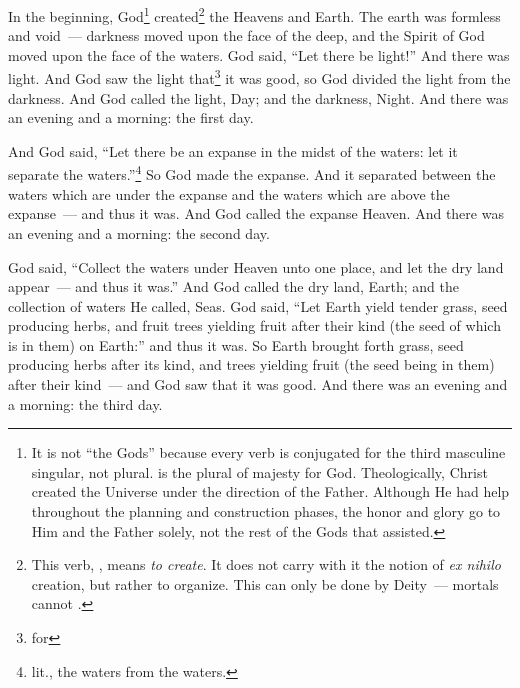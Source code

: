 
\begin{inparaenum}
     In the beginning, God\footnote{It is not ``the Gods'' because every verb is conjugated for the third masculine singular, not plural.  is the plural of majesty for God. Theologically, Christ created the Universe under the direction of the Father. Although He had help throughout the planning and construction phases, the honor and glory go to Him and the Father solely, not the rest of the Gods that assisted.} created\footnote{This verb, , means \textit{to create}. It does not carry with it the notion of \textit{ex nihilo} creation, but rather to organize. This can only be done by Deity~--- mortals cannot .} the Heavens and Earth.%
     The earth was formless and void~--- darkness moved upon the face of the deep, and the Spirit of God moved upon the face of the waters.%
     God said, ``Let there be light!'' And there was light.%
     And God saw the light that\footnote{for} it was good, so God divided the light from the darkness.%
     And God called the light, Day; and the darkness, Night. And there was an evening and a morning: the first day.%
    
     And God said, ``Let there be an expanse in the midst of the waters: let it separate the waters.''\footnote{lit., the waters from the waters.}%
     So God made the expanse. And it separated between the waters which are under the expanse and the waters which are above the expanse~--- and thus it was.%
     And God called the expanse Heaven. And there was an evening and a morning: the second day.%
    
     God said, ``Collect the waters under Heaven unto one place, and let the dry land appear~--- and thus it was.''%
     And God called the dry land, Earth; and the collection of waters He called, Seas.%
     God said, ``Let Earth yield tender grass, seed producing herbs, and fruit trees yielding fruit after their kind (the seed of which is in them) on Earth:'' and thus it was.%
     So Earth brought forth grass, seed producing herbs after its kind, and trees yielding fruit (the seed being in them) after their kind~--- and God saw that it was good.%
     And there was an evening and a morning: the third day.%
    

\end{inparaenum}
